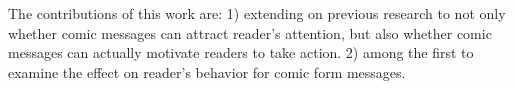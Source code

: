The contributions of this work are: 1) extending on previous research to not only whether comic messages can attract reader's attention, but also whether comic messages can actually motivate readers to take action. 2) among the first to examine the effect on reader's behavior for comic form messages.\par
